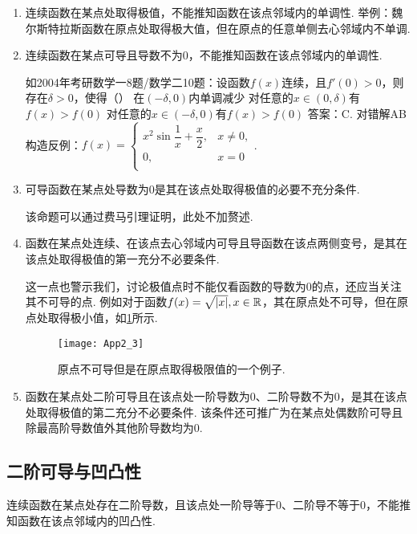     \begin{enumerate}[label=(\arabic*)]

      \item 连续函数在某点处取得极值，不能推知函数在该点邻域内的单调性.
      举例：魏尔斯特拉斯函数在原点处取得极大值，但在原点的任意单侧去心邻域内不单调.

      \item 连续函数在某点可导且导数不为0，不能推知函数在该点邻域内的单调性.

      如2004年考研数学一8题/数学二10题：设函数$f(x)$连续，且$f'(0)>0$，则存在$\delta>0$，使得（\qquad）
      {在$(-\delta,0)$内单调减少}
      {对任意的$x \in (0,\delta)$有$f(x)>f(0)$}
      {对任意的$x \in (-\delta,0)$有$f(x)>f(0)$}
      答案：C. 对错解AB构造反例：$f\left( x \right) =\begin{cases}
        x^2\sin \dfrac{1}{x} + \dfrac{x}{2}, & x\ne 0, \\
        0, & x=0 \\
      \end{cases}$.

      \item 可导函数在某点处导数为0是其在该点处取得极值的必要不充分条件.

      该命题可以通过费马引理证明，此处不加赘述.

      \item 函数在某点处连续、在该点去心邻域内可导且导函数在该点两侧变号，是其在该点处取得极值的第一充分不必要条件.

      这一点也警示我们，讨论极值点时不能仅看函数的导数为0的点，还应当关注其不可导的点. 例如对于函数$f(x) = \sqrt{\left| x \right|}, x \in \mathbb{R}$，其在原点处不可导，但在原点处取得极小值，如\ref{fig:原点不可导但是在原点取得极限值的一个例子.}所示.
      \begin{figure}[!h]
        \centering
        \texttt{[image: App2\_3]}
        \caption{原点不可导但是在原点取得极限值的一个例子.}\label{fig:原点不可导但是在原点取得极限值的一个例子.}
      \end{figure}

      \item 函数在某点处二阶可导且在该点处一阶导数为0、二阶导数不为0，是其在该点处取得极值的第二充分不必要条件. 该条件还可推广为在某点处偶数阶可导且除最高阶导数值外其他阶导数均为0.
    \end{enumerate}

  \subsection{二阶可导与凹凸性}
    \hspace*{2em}连续函数在某点处存在二阶导数，且该点处一阶导等于0、二阶导不等于0，不能推知函数在该点邻域内的凹凸性.

